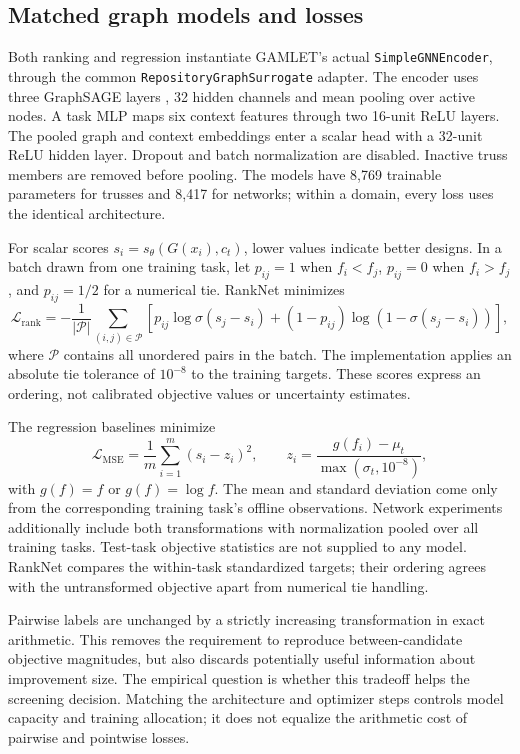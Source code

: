 \documentclass[11pt,a4paper]{article}
\begin{document}
\subsection{Matched graph models and losses}
Both ranking and regression instantiate GAMLET's actual \texttt{SimpleGNNEncoder}, through the common \texttt{RepositoryGraphSurrogate} adapter. The encoder uses three GraphSAGE layers \citep{hamilton2017}, 32 hidden channels and mean pooling over active nodes. A task MLP maps six context features through two 16-unit ReLU layers. The pooled graph and context embeddings enter a scalar head with a 32-unit ReLU hidden layer. Dropout and batch normalization are disabled. Inactive truss members are removed before pooling. The models have 8,769 trainable parameters for trusses and 8,417 for networks; within a domain, every loss uses the identical architecture.

For scalar scores $s_i=s_\theta(G(x_i),c_t)$, lower values indicate better designs. In a batch drawn from one training task, let $p_{ij}=1$ when $f_i<f_j$, $p_{ij}=0$ when $f_i>f_j$, and $p_{ij}=1/2$ for a numerical tie. RankNet minimizes
\begin{equation}
\mathcal L_{\mathrm{rank}}=-\frac{1}{|\mathcal P|}\sum_{(i,j)\in\mathcal P}
\left[p_{ij}\log\sigma(s_j-s_i)+(1-p_{ij})\log(1-\sigma(s_j-s_i))\right],
\end{equation}
where $\mathcal P$ contains all unordered pairs in the batch. The implementation applies an absolute tie tolerance of $10^{-8}$ to the training targets. These scores express an ordering, not calibrated objective values or uncertainty estimates.

The regression baselines minimize
\begin{equation}
\mathcal L_{\mathrm{MSE}}=\frac{1}{m}\sum_{i=1}^{m}(s_i-z_i)^2,
\qquad z_i=\frac{g(f_i)-\mu_t}{\max(\sigma_t,10^{-8})},
\end{equation}
with $g(f)=f$ or $g(f)=\log f$. The mean and standard deviation come only from the corresponding training task's offline observations. Network experiments additionally include both transformations with normalization pooled over all training tasks. Test-task objective statistics are not supplied to any model. RankNet compares the within-task standardized targets; their ordering agrees with the untransformed objective apart from numerical tie handling.

Pairwise labels are unchanged by a strictly increasing transformation in exact arithmetic. This removes the requirement to reproduce between-candidate objective magnitudes, but also discards potentially useful information about improvement size. The empirical question is whether this tradeoff helps the screening decision. Matching the architecture and optimizer steps controls model capacity and training allocation; it does not equalize the arithmetic cost of pairwise and pointwise losses.
\end{document}
